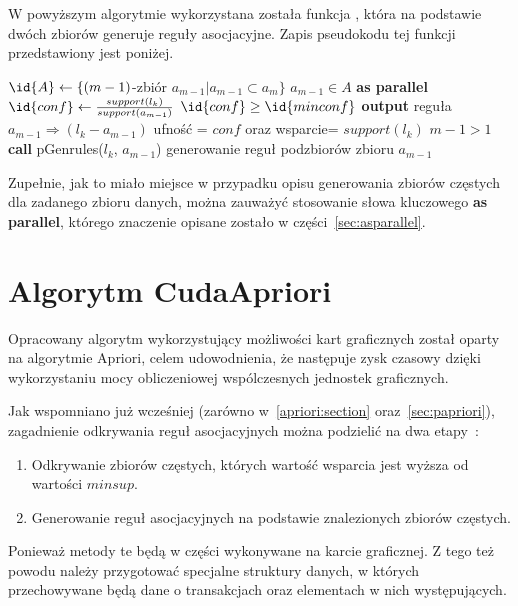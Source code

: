 W powyższym algorytmie wykorzystana została funkcja , która na podstawie dwóch zbiorów generuje reguły asocjacyjne. Zapis pseudokodu tej funkcji przedstawiony jest poniżej.

\begin{codebox}
		\li $\id{A} \gets \lbrace (m-1)$-zbiór $a_{m-1} | a_{m-1} \subset a_m \rbrace$
		\li \For $a_{m-1} \in A$ \textbf{as parallel}
			\li \Do
			$\id{conf} \gets \frac{support(l_k)}{support(a_{m-1})}$
			\li \If $\id{conf} \geq \id{minconf}$
				\li \Then
						\textbf{output} reguła $a_{m-1} \Rightarrow (l_k - a_{m-1})$ \CommentSymbol ufność = $conf$ oraz wsparcie= $support(l_k)$
						\li \If $m-1 > 1$ 
							\li \Then
							\textbf{call} pGenrules($l_k$, $a_{m-1}$) \CommentSymbol generowanie reguł podzbiorów zbioru $a_{m-1}$
						\End
				\End
			\End
		\End
\end{codebox}

Zupełnie, jak to miało miejsce w przypadku opisu generowania zbiorów częstych dla zadanego zbioru danych, można zauważyć stosowanie słowa kluczowego \textbf{as parallel}, którego znaczenie opisane zostało w części~\ref{sec:asparallel}.

\section{Algorytm CudaApriori\label{sec:capriori}}

Opracowany algorytm wykorzystujący możliwości kart graficznych został oparty na algorytmie Apriori, celem udowodnienia, że następuje zysk czasowy dzięki wykorzystaniu mocy obliczeniowej wspólczesnych jednostek graficznych.

Jak wspomniano już wcześniej (zarówno w~\ref{apriori:section} oraz~\ref{sec:papriori}), zagadnienie odkrywania reguł asocjacyjnych można podzielić na dwa etapy~\cite{Problem:Statement}:
\begin{enumerate}
	\item Odkrywanie zbiorów częstych, których wartość wsparcia jest wyższa od wartości $minsup$.
	\item Generowanie reguł asocjacyjnych na podstawie znalezionych zbiorów częstych.
\end{enumerate}

Ponieważ metody te będą w części wykonywane na karcie graficznej. Z tego też powodu należy przygotować specjalne struktury danych, w których przechowywane będą dane o transakcjach oraz elementach w nich występujących.

